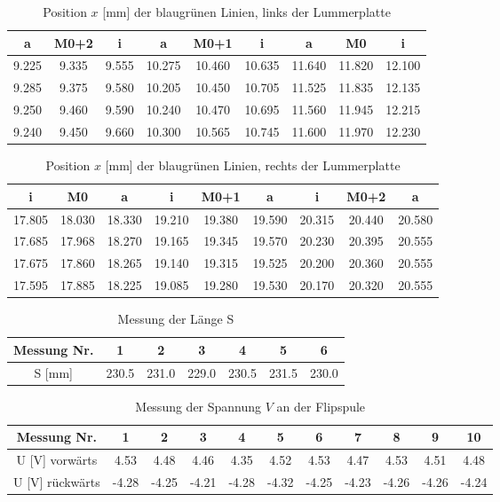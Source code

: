 \documentclass[a4paper,parskip,11pt, DIV12]{scrreprt}
\begin{document}
	\begin{table}[H]	
	\begin{tabular}{|c|c|c||c|c|c||c|c|c|}
	\hline 
a	&	M0+2	&	i	&	a	&	M0+1	&	i	&	a	&	M0	&	i	\\
	\hline
	\hline
9.225	&	9.335	&	9.555	&	10.275	&	10.460	&	10.635	&	11.640	&	11.820	&	12.100	\\
	\hline
9.285	&	9.375	&	9.580	&	10.205	&	10.450	&	10.705	&	11.525	&	11.835	&	12.135	\\
	\hline
9.250	&	9.460	&	9.590	&	10.240	&	10.470	&	10.695	&	11.560	&	11.945	&	12.215	\\
	\hline
9.240	&	9.450	&	9.660	&	10.300	&	10.565	&	10.745	&	11.600	&	11.970	&	12.230	\\
	\hline
	\end{tabular} 
	\caption{Position $x$ [mm] der blaugrünen Linien, links der Lummerplatte}
	\end{table}
	
	
	\begin{table}[H]
	\begin{tabular}{|c|c|c||c|c|c||c|c|c|}
	\hline 
i	&	M0	&	a	&	i	&	M0+1	&	a	&	i	&	M0+2	&	a	\\
	\hline
	\hline
17.805	&	18.030	&	18.330	&	19.210	&	19.380	&	19.590	&	20.315	&	20.440	&	20.580	\\
	\hline
17.685	&	17.968	&	18.270	&	19.165	&	19.345	&	19.570	&	20.230	&	20.395	&	20.555	\\
	\hline
17.675	&	17.860	&	18.265	&	19.140	&	19.315	&	19.525	&	20.200	&	20.360	&	20.555	\\
	\hline
17.595	&	17.885	&	18.225	&	19.085	&	19.280	&	19.530	&	20.170	&	20.320	&	20.555	\\
	\hline
	\end{tabular} 
	\caption{Position $x$ [mm] der blaugrünen Linien, rechts der Lummerplatte}
	\end{table}
	
	\begin{table}[H]
	\begin{tabular}{|c|c|c|c|c|c|c|}
	\hline 
Messung Nr.	&	1	&	2	&	3	&	4	&	5	&	6	\\
\hline \hline
S [mm]	&	230.5	&	231.0	&	229.0	&	230.5	&	231.5	&	230.0	\\
	\hline
	\end{tabular} 
	\caption{Messung der Länge S}
	\end{table}
	
	\begin{table}[H]
	\begin{tabular}{|c|c|c|c|c|c|c|c|c|c|c|}
	\hline 
Messung Nr.	&	1	&	2	&	3	&	4	&	5	&	6	&	7	&	8	&	9	&	10	\\
\hline \hline
U [V] vorwärts	&	4.53	&	4.48	&	4.46	&	4.35	&	4.52	&	4.53	&	4.47	&	4.53	&	4.51	&	4.48	\\
\hline
U [V] rückwärts	&	-4.28	&	-4.25	&	-4.21	&	-4.28	&	-4.32	&	-4.25	&	-4.23	&	-4.26	&	-4.26	&	-4.24	\\
	\hline
	\end{tabular} 
	\caption{Messung der Spannung $V$ an der Flipspule}
	\end{table}
\end{document}
